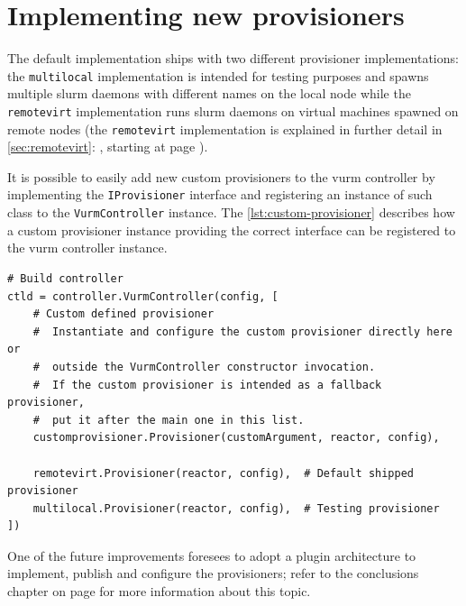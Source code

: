 \section{Implementing new provisioners}
\label
{sec:new-provisioners}

The default implementation ships with two different provisioner implementations: the \texttt{multilocal} implementation is intended for testing purposes and spawns multiple \gls{slurm} daemons with different names on the local node while the \texttt{remotevirt} implementation runs \gls{slurm} daemons on virtual machines spawned on remote nodes (the \texttt{remotevirt} implementation is explained in further detail in \autoref{sec:remotevirt}: \emph{}, starting at page \pageref{sec:remotevirt}).

It is possible to easily add new custom provisioners to the \gls{vurm} controller by implementing the \texttt{IProvisioner} interface and registering an instance of such class to the \texttt{VurmController} instance. The \autoref{lst:custom-provisioner} describes how a custom provisioner instance providing the correct interface can be registered to the \gls{vurm} controller instance.

\begin{lstlisting}
# Build controller
ctld = controller.VurmController(config, [
    # Custom defined provisioner
    #  Instantiate and configure the custom provisioner directly here or
    #  outside the VurmController constructor invocation.
    #  If the custom provisioner is intended as a fallback provisioner,
    #  put it after the main one in this list.
    customprovisioner.Provisioner(customArgument, reactor, config),

    remotevirt.Provisioner(reactor, config),  # Default shipped provisioner
    multilocal.Provisioner(reactor, config),  # Testing provisioner
])
\end{lstlisting}
\lstset{firstnumber=1}

One of the future improvements foresees to adopt a plugin architecture to implement, publish and configure the provisioners; refer to the conclusions chapter on page \pageref{sec:future} for more information about this topic.

